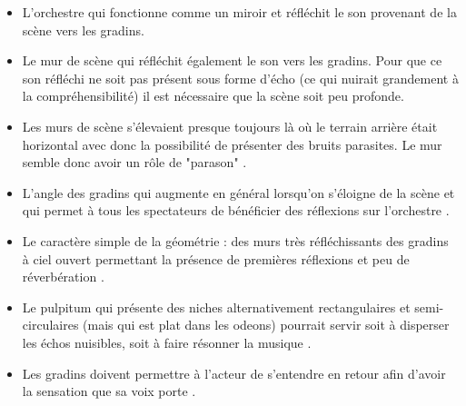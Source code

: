 \begin{itemize}
\item L'orchestre qui fonctionne comme un miroir et réfléchit le son provenant de la scène vers les gradins.
\item Le mur de scène qui réfléchit également le son vers les gradins. Pour que ce son réfléchi ne soit pas présent sous forme d'écho (ce qui nuirait grandement à la compréhensibilité) il est nécessaire que la scène soit peu profonde.
\item Les murs de scène s'élevaient presque toujours là où le terrain arrière était horizontal avec donc la possibilité de présenter des bruits parasites. Le mur semble donc avoir un rôle de "parason" \cite[p.38]{canac}.
\item L'angle des gradins qui augmente en général lorsqu'on s'éloigne de la scène et qui permet à tous les spectateurs de bénéficier des réflexions sur l'orchestre \cite[p.103-109]{canac}.
\item Le caractère simple de la géométrie : des murs très réfléchissants des gradins à ciel ouvert permettant la présence de premières réflexions et peu de réverbération \cite[p.33]{canac}.
\item Le \gls{pulpitum} qui présente des niches alternativement rectangulaires et semi-circulaires (mais qui est plat dans les \glspl{odeon}) pourrait servir soit à disperser les échos nuisibles, soit à faire résonner la musique \cite[p.38]{canac}.
\item Les gradins doivent permettre à l'acteur de s'entendre en retour afin d'avoir la sensation que sa voix porte \cite[p.42 - tab.II-4]{canac}.
\end{itemize}
